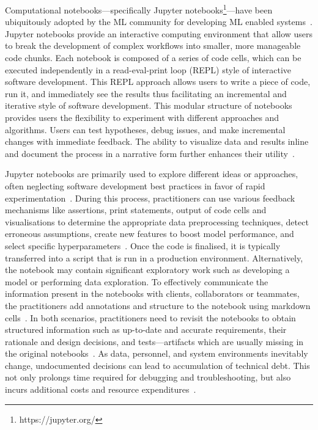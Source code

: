 Computational notebooks---specifically Jupyter notebooks\footnote{https://jupyter.org/}---have been ubiquitously adopted by the ML community for developing ML enabled systems~\cite{pimentel2019large-scale,quaranta2021kgtorrent,psallidas2019data,perkel2018why}. Jupyter notebooks provide an interactive computing environment that allow users to break the development of complex workflows into smaller, more manageable code chunks. Each notebook is composed of a series of code cells, which can be executed independently in a read-eval-print loop (REPL) style of interactive software development. This REPL approach allows users to write a piece of code, run it, and immediately see the results thus facilitating an incremental and iterative style of software development. This modular structure of notebooks provides users the flexibility to experiment with different approaches and algorithms. Users can test hypotheses, debug issues, and make incremental changes with immediate feedback. The ability to visualize data and results inline and document the process in a narrative form further enhances their utility~\cite{kery2018story,head2019managing,rule2018exploration,chattopadhyay2020whats}.

Jupyter notebooks are primarily used to explore different ideas or approaches, often neglecting software development best practices in favor of rapid experimentation~\cite{kery2018story,rule2018exploration,pimentel2019large-scale}. During this process, practitioners can use various feedback mechanisms like assertions, print statements, output of code cells and visualisations to determine the appropriate data preprocessing techniques, detect erroneous assumptions, create new features to boost model performance, and select specific hyperparameters~\cite{head2019managing,chattopadhyay2020whats}. Once the code is finalised, it is typically transferred into a script that is run in a production environment. Alternatively, the notebook may contain significant exploratory work such as developing a model or performing data exploration. To effectively communicate the information present in the notebooks with clients, collaborators or teammates, the practitioners add annotations and structure to the notebook using markdown cells~\cite{kery2018story,rule2018exploration}. In both scenarios, practitioners need to revisit the notebooks to obtain structured information such as up-to-date and accurate requirements, their rationale and design decisions, and tests---artifacts which are usually missing in the original notebooks~\cite{pimentel2019large-scale,psallidas2019data,grotov2022large-scale}. As data, personnel, and system environments inevitably change, undocumented decisions can lead to accumulation of technical debt. This not only prolongs time required for debugging and troubleshooting, but also incurs additional costs and resource expenditures~\cite{sculley2015hidden,amershi2019software,sambasivan2021everyone}.

